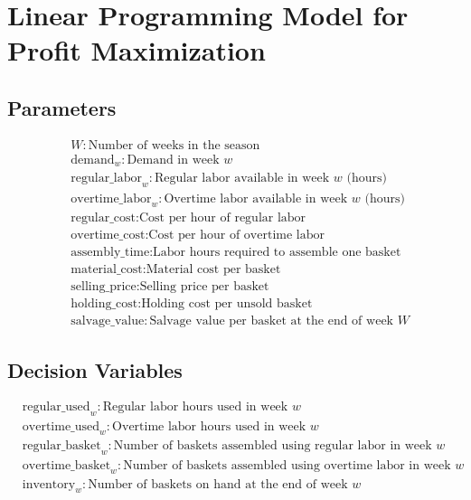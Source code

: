 \documentclass{article}
\begin{document}
\section*{Linear Programming Model for Profit Maximization}

\subsection*{Parameters}

\begin{align*}
  & W: \text{Number of weeks in the season} \\
  & \text{demand}_w: \text{Demand in week } w \\
  & \text{regular\_labor}_w: \text{Regular labor available in week } w \text{ (hours)} \\
  & \text{overtime\_labor}_w: \text{Overtime labor available in week } w \text{ (hours)} \\
  & \text{regular\_cost}: \text{Cost per hour of regular labor} \\
  & \text{overtime\_cost}: \text{Cost per hour of overtime labor} \\
  & \text{assembly\_time}: \text{Labor hours required to assemble one basket} \\
  & \text{material\_cost}: \text{Material cost per basket} \\
  & \text{selling\_price}: \text{Selling price per basket} \\
  & \text{holding\_cost}: \text{Holding cost per unsold basket} \\
  & \text{salvage\_value}: \text{Salvage value per basket at the end of week } W
\end{align*}

\subsection*{Decision Variables}

\begin{align*}
  & \text{regular\_used}_w: \text{Regular labor hours used in week } w \\
  & \text{overtime\_used}_w: \text{Overtime labor hours used in week } w \\
  & \text{regular\_basket}_w: \text{Number of baskets assembled using regular labor in week } w \\
  & \text{overtime\_basket}_w: \text{Number of baskets assembled using overtime labor in week } w \\
  & \text{inventory}_w: \text{Number of baskets on hand at the end of week } w
\end{align*}
\end{document}
